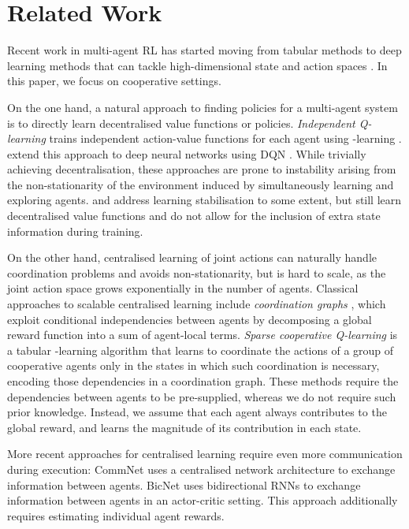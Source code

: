 \documentclass{article}
\begin{document}
 \section{Related Work}
\label{sec:related}

Recent work in multi-agent RL has started moving from 
tabular methods \cite{yang_multiagent_2004, busoniu_comprehensive_2008} to deep learning methods that can tackle
high-dimensional state and action spaces \cite{tampuu_multiagent_2015,foerster_counterfactual_2017,peng_multiagent_2017}. In this paper, we 
focus on cooperative settings.

On the one hand, a natural approach to finding policies for a multi-agent system 
is to directly learn decentralised value functions or policies. 
\emph{Independent Q-learning} \cite{tan_multi-agent_1993} trains independent
action-value functions for each agent using -learning \cite{watkins_learning_1989}. \cite{tampuu_multiagent_2015} extend this approach to 
deep neural networks using DQN \cite{mnih_human-level_2015}.
While trivially achieving decentralisation, these approaches are prone to instability arising from the non-stationarity of the environment 
induced by simultaneously learning and exploring agents. 
\citet{omidshafiei_deep_2017} and \citet{foerster_stabilising_2017} address 
learning stabilisation to some extent, but still learn decentralised value 
functions and do not allow for the inclusion of extra state information during training.

On the other hand, centralised learning of joint actions can naturally handle 
coordination problems and avoids non-stationarity, but is hard to scale, as the joint action space grows exponentially in the 
number of agents.
Classical approaches to scalable centralised learning include 
\textit{coordination graphs} \cite{guestrin_multiagent_2002}, which exploit conditional independencies between agents by decomposing a global reward function 
into a sum of agent-local terms.
\textit{Sparse cooperative Q-learning} \cite{kok_collaborative_2006} is a tabular -learning 
algorithm that learns to coordinate the actions of a group of cooperative 
agents only in the states in which such coordination is necessary, encoding
those dependencies in a coordination graph. 
These methods require the dependencies between agents to be pre-supplied, whereas we do not require such prior knowledge. 
Instead, we assume that each agent always contributes to the global reward, and learns the magnitude of its contribution in each state.

More recent approaches for centralised learning require even more 
communication during execution: CommNet 
\cite{sukhbaatar_learning_2016} uses a centralised network architecture to exchange information between agents. BicNet 
\cite{peng_multiagent_2017} uses bidirectional RNNs to exchange 
information between agents in an actor-critic setting. This approach 
additionally requires estimating individual agent rewards.
\end{document}
